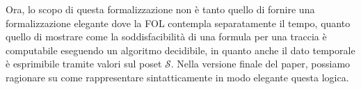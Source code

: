 \begin{UnknownEnvironment}
	\color{magenta}Ora, lo scopo di questa formalizzazione non è tanto quello di fornire una formalizzazione elegante dove la FOL contempla separatamente il tempo, quanto quello di mostrare come la soddisfacibilità di una formula per una traccia è computabile eseguendo un algoritmo decidibile, in quanto anche il dato temporale è esprimibile tramite valori sul poset $\mathcal{S}$. Nella versione finale del paper, possiamo ragionare su come rappresentare sintatticamente in modo elegante questa logica. 
\end{UnknownEnvironment}
%

